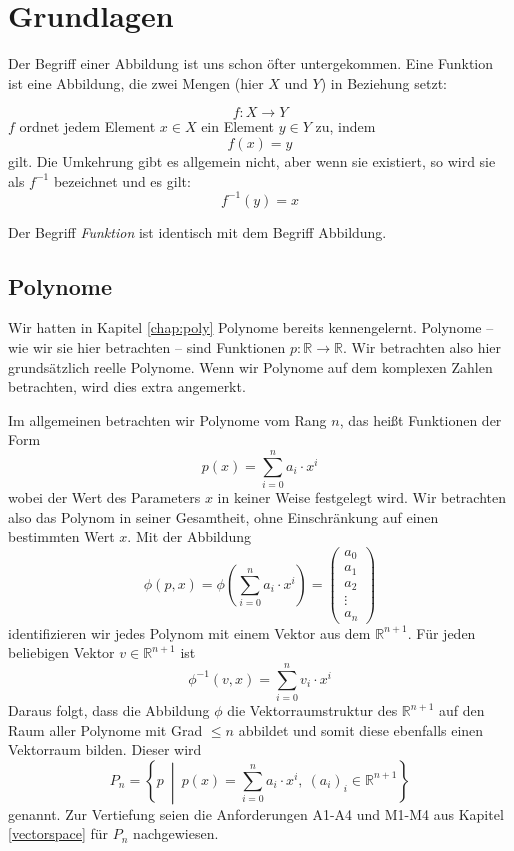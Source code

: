 
\chapter{Grundlagen}

Der Begriff einer Abbildung ist uns schon öfter untergekommen. Eine Funktion ist eine Abbildung, die zwei Mengen (hier $X$ und $Y$) in Beziehung setzt:

\[ f: X \longrightarrow Y \]
$f$ ordnet jedem Element $x\in X$ ein Element $y\in Y$ zu, indem
\[f(x) =y\]
gilt. Die Umkehrung gibt es allgemein nicht, aber wenn sie existiert, so wird sie als $f^{-1}$ bezeichnet und es gilt:
\[ f^{-1}(y) =x\]

\begin{definition}
Der Begriff \textsl{Funktion} ist identisch mit dem Begriff Abbildung. 
\end{definition}


\section{Polynome}

Wir hatten in Kapitel \ref{chap:poly} Polynome bereits kennengelernt. Polynome -- wie wir sie hier betrachten -- sind Funktionen $p :\mathbb{R} \longrightarrow \mathbb{R}$. Wir betrachten also hier grundsätzlich reelle Polynome. Wenn wir Polynome auf dem komplexen Zahlen betrachten, wird dies extra angemerkt.

Im allgemeinen betrachten wir Polynome vom Rang $n$, das heißt Funktionen der Form
\[
p(x) = \sum_{i=0}^{n} a_i \cdot x^i
\]
wobei der Wert des Parameters $x$ in keiner Weise festgelegt wird. Wir betrachten also das Polynom in seiner Gesamtheit, ohne Einschränkung auf einen bestimmten Wert $x$. Mit der Abbildung 
\[
\phi(p,x) = \phi\left( \sum_{i=0}^{n} a_i \cdot x^i \right) = \begin{pmatrix}
a_0\\ a_1 \\ a_2 \\ \vdots \\ a_n
\end{pmatrix}
\]
identifizieren wir jedes Polynom mit einem Vektor aus dem $\mathbb{R}^{n+1}$. Für jeden beliebigen Vektor $v\in \mathbb{R}^{n+1}$ ist 
\[ 
\phi^{-1}(v,x) = \sum_{i=0}^{n} v_i \cdot x^i
\]
Daraus folgt, dass die Abbildung $\phi$ die Vektorraumstruktur des $\mathbb{R}^{n+1}$ auf den Raum aller Polynome mit Grad $\le n$ abbildet und somit diese ebenfalls einen Vektorraum bilden. Dieser wird 
\[P_n =\left\lbrace p \ \middle\vert \  p(x) = \sum_{i=0}^{n} a_i \cdot x^i, \ (a_i)_i \in \mathbb{R}^{n+1} \right\rbrace  \]
genannt. Zur Vertiefung seien die Anforderungen A1-A4 und M1-M4 aus Kapitel \ref{vectorspace} für $P_n$ nachgewiesen.


